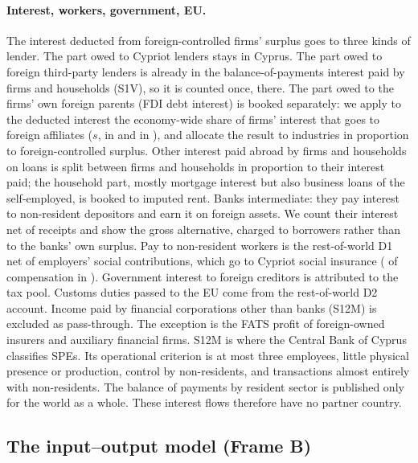 \documentclass[11pt]{article}
\begin{document}
\paragraph{Interest, workers, government, EU.}
The interest deducted from foreign-controlled firms' surplus goes to three kinds of lender.
The part owed to Cypriot lenders stays in Cyprus.
The part owed to foreign third-party lenders is already in the balance-of-payments interest paid by firms and households (S1V), so it is counted once, there.
The part owed to the firms' own foreign parents (FDI debt interest) is booked separately: we apply to the deducted interest the economy-wide share of firms' interest that goes to foreign affiliates ($s$, \IntraShareFirst{} in \FirstYear{} and \IntraShareLast{} in \LastYear{}), and allocate the result to industries in proportion to foreign-controlled surplus.
Other interest paid abroad by firms and households on loans is split between firms and households in proportion to their interest paid; the household part, mostly mortgage interest but also business loans of the self-employed, is booked to imputed rent.
Banks intermediate: they pay interest to non-resident depositors and earn it on foreign assets.
We count their interest net of receipts and show the gross alternative, charged to borrowers rather than to the banks' own surplus.
Pay to non-resident workers is the rest-of-world D1 net of employers' social contributions, which go to Cypriot social insurance (\SSCShareLast{} of compensation in \LastYear{}).
Government interest to foreign creditors is attributed to the tax pool.
Customs duties passed to the EU come from the rest-of-world D2 account.
Income paid by financial corporations other than banks (S12M) is excluded as pass-through.
The exception is the FATS profit of foreign-owned insurers and auxiliary financial firms.
S12M is where the Central Bank of Cyprus classifies SPEs.
Its operational criterion is at most three employees, little physical presence or production, control by non-residents, and transactions almost entirely with non-residents.
The balance of payments by resident sector is published only for the world as a whole.
These interest flows therefore have no partner country.

\subsection{The input--output model (Frame B)}
\end{document}
